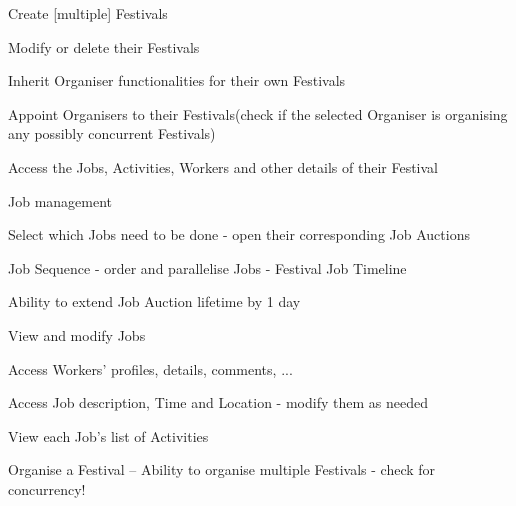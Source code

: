 \begin{packed_enum}
\begin{packed_enum}
				\end{packed_enum}
				
				\item	{}
				\begin{packed_enum}
					\item Create [multiple] Festivals
					\item Modify or delete their Festivals	
					\item Inherit Organiser functionalities for their own Festivals
					\item Appoint Organisers to their Festivals(check if the selected Organiser is organising any possibly concurrent Festivals)
					\item Access the Jobs, Activities, Workers and other details of their Festival
				\end{packed_enum}
				
				\item	{}
				\begin{packed_enum}
					\item Job management
					\begin{packed_enum}
						\item Select which Jobs need to be done - open their corresponding Job Auctions
						\item Job Sequence - order and parallelise Jobs - Festival Job Timeline
						\item Ability to extend Job Auction lifetime by 1 day
						\item View and modify Jobs
						\begin{packed_enum}
							\item Access Workers' profiles, details, comments, ...
							\item Access Job description, Time and Location - modify them as needed
							\item View each Job's list of Activities
						\end{packed_enum}
					\end{packed_enum}
					
					\item Organise a Festival -- Ability to organise multiple Festivals - check for concurrency!
				\end{packed_enum}
				

\end{packed_enum}
